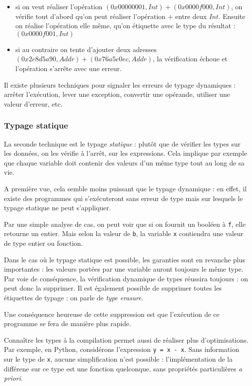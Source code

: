 \begin{itemize}
\item
  si on veut réaliser l'opération
  $(0x00000001, Int) + (0x0000f000, Int)$, on vérifie tout d'abord qu'on
  peut réaliser l'opération $+$ entre deux $Int$. Ensuite on réalise
  l'opération elle même, qu'on étiquette avec le type du résultat :
  $(0x0000f001, Int)$
\item
  si au contraire on tente d'ajouter deux adresses
  $(0x2e8d5a90, Addr) + (0x76a5e0ec, Addr)$, la vérification échoue et
  l'opération s'arrête avec une erreur.
\end{itemize}

Il existe plusieurs techniques pour signaler les erreurs de typage dynamiques :
arrêter l'exécution, lever une exception, convertir une opérande, utiliser une
valeur d'erreur, etc.

\subsubsection{Typage statique}

La seconde technique est le typage \emph{statique} : plutôt que de vérifier les
types sur les données, on les vérifie à l'arrêt, sur les expressions. Cela
implique par exemple que chaque variable doit contenir des valeurs d'un même
type tout au long de sa vie.

A première vue, cela semble moins puissant que le typage dynamique : en effet,
il existe des programmes qui s'exécuteront sans erreur de type mais sur lesquels
le typage statique ne peut s'appliquer.


Par une simple analyse de cas, on peut voir que si on fournit un booléen à
\texttt{f}, elle retourne un entier. Mais selon la valeur de \texttt{b}, la
variable \texttt{x} contiendra une valeur de type entier ou fonction.

Dans le cas où le typage statique est possible, les garanties sont en revanche
plus importantes : les valeurs portées par une variable auront toujours le même
type. Par voie de conséquence, la vérification dynamique de types réussira
toujours : on peut donc la supprimer. Il est également possible de supprimer
toutes les étiquettes de typage : on parle de \emph{type erasure}.

Une conséquence heureuse de cette suppression est que l'exécution de ce
programme se fera de manière plus rapide.

Connaître les types à la compilation permet aussi de réaliser plus
d'optimisations. Par exemple, en Python, considérons l'expression \texttt{y = x
- x}. Sans information sur le type de \texttt{x}, aucune simplification n'est
possible : l'implémentation de la différene sur ce type est une fonction
quelconque, sans propriétés particulières \emph{a priori}.

